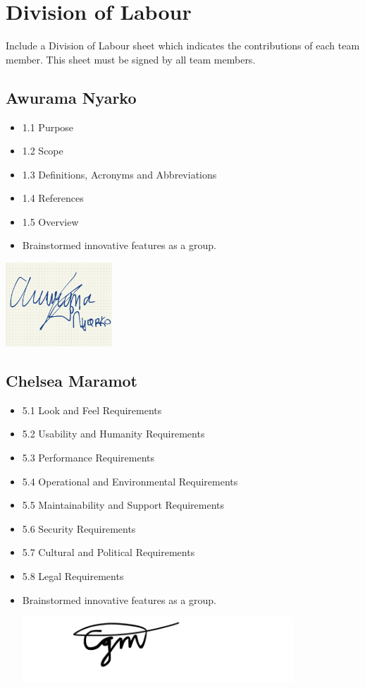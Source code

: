 \documentclass[]{article}
\begin{document}

\appendix
\section{Division of Labour}
\label{sec:division_of_labour}
Include a Division of Labour sheet which indicates the contributions of each team member. This sheet must be signed by all team members.
\subsection{Awurama Nyarko}
\label{subsec:awurama_nyarko}
\begin{itemize}
	\item 1.1 Purpose
	\item 1.2 Scope
	\item 1.3 Definitions, Acronyms and Abbreviations
	\item 1.4 References
	\item 1.5 Overview
	\item Brainstormed innovative features as a group.
\end{itemize}
\includegraphics[width=0.3\textwidth]{awurama.jpg}

\subsection{Chelsea Maramot}
\label{subsec:chelsea_maramot}
\begin{itemize}
	\item 5.1 Look and Feel Requirements
	\item 5.2 Usability and Humanity Requirements
	\item 5.3 Performance Requirements
	\item 5.4 Operational and Environmental Requirements
	\item 5.5 Maintainability and Support Requirements
	\item 5.6 Security Requirements
	\item 5.7 Cultural and Political Requirements
	\item 5.8 Legal Requirements
	\item Brainstormed innovative features as a group.

	      \includegraphics[width=0.8\textwidth]{chelsea.png}
\end{itemize}
\end{document}
